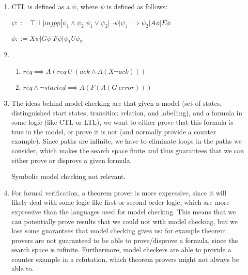 


\begin{enumerate}[label=(\alph*)]

  \item
    CTL is defined as a $\psi$, where $\psi$ is defined as follows:

    $\psi ::= \top | \bot | injp p | \psi_1 \wedge \psi_2 | \psi_1 \vee \psi_2 | \neg \psi | \psi_1 \implies \psi_2 | A \phi | E \phi$

    $\phi ::= X \psi | G \psi | F \psi | \psi_1 U \psi_2$

    \item
      \begin{enumerate}[label=(\roman*)]
          
        \item
      $req \implies A (req\ U\ (ack \wedge A (X \neg ack)))$

      \item
        $req \wedge \neg started \implies A (F (A (G\ error)))$
      \end{enumerate}

      \item
        The ideas behind model checking are that given a model (set of states, distinguished start states, transition relation, and labelling), and a formula in some logic (like CTL or LTL), we want to either prove that this formula is true in the model, or prove it is not (and normally provide a counter example). Since paths are infinite, we have to eliminate loops in the paths we consider, which makes the search space finite and thus guarantees that we can either prove or disprove a given formula.

        Symbolic model checking not relevant.

        \item
        For formal verification, a theorem prover is more expressive, since it will likely deal with some logic like first or second order logic, which are more expressive than the languages used for model checking. This means that we can potentially prove results that we could not with model checking, but we lose some guarantees that model checking gives us: for example theorem provers are not guaranteed to be able to prove/disprove a formula, since the search space is infinite. Furthermore, model checkers are able to provide a counter example in a refutation, which theorem provers might not always be able to.
        
    \end{enumerate}

